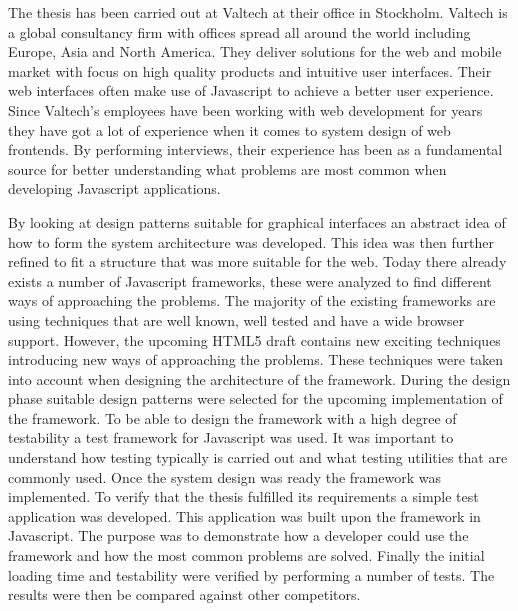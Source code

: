 
The thesis has been carried out at Valtech at their office in Stockholm. Valtech is a global consultancy firm with offices spread all around the world including Europe, Asia and North America. They deliver solutions for the web and mobile market with focus on high quality products and intuitive user interfaces. Their web interfaces often make use of Javascript to achieve a better user experience. Since Valtech's employees have been working with web development for years they have got a lot of experience when it comes to system design of web frontends. By performing interviews, their experience has been as a fundamental source for better understanding what problems are most common when developing Javascript applications.

By looking at design patterns suitable for graphical interfaces an abstract idea of how to form the system architecture was developed. This idea was then further refined to fit a structure that was more suitable for the web. Today there already exists a number of Javascript frameworks, these were analyzed to find different ways of approaching the problems. The majority of the existing frameworks are using techniques that are well known, well tested and have a wide browser support. However, the upcoming HTML5 draft contains new exciting techniques introducing new ways of approaching the problems. These techniques were taken into account when designing the architecture of the framework. During the design phase suitable design patterns were selected for the upcoming implementation of the framework. To be able to design the framework with a high degree of testability a test framework for Javascript was used. It was important to understand how testing typically is carried out and what testing utilities that are commonly used. Once the system design was ready the framework was implemented. To verify that the thesis fulfilled its requirements a simple test application was developed. This application was built upon the framework in Javascript. The purpose was to demonstrate how a developer could use the framework and how the most common problems are solved. Finally the initial loading time and testability were verified by performing a number of tests. The results were then be compared against other competitors.



